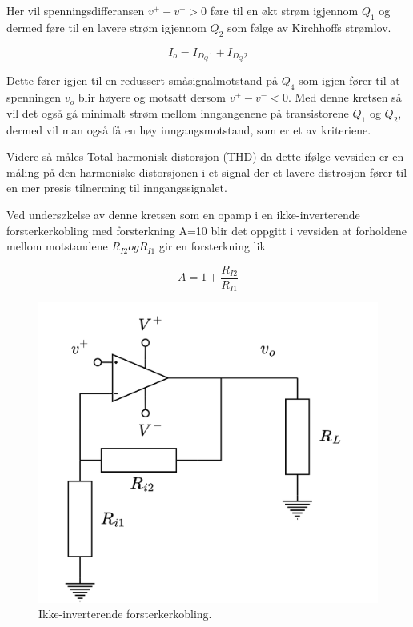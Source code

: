 Her vil spenningsdifferansen $v^+-v^- > 0$ føre til en økt strøm igjennom $Q_1$ og dermed føre til en lavere strøm igjennom $Q_2$ som følge av Kirchhoffs strømlov.
 
 \begin{equation}
	I_o = I_{D_Q1}+I_{D_Q2}
 \end{equation}

 Dette fører igjen til en redussert småsignalmotstand på $Q_4$ som igjen fører til at spenningen $v_o$ blir høyere og motsatt dersom $v^+-v^- < 0$. Med denne kretsen så vil det også gå minimalt strøm mellom inngangenene på transistorene $Q_1$ og $Q_2$, dermed vil man også få en høy inngangsmotstand, som er et av kriteriene.

 Videre så måles Total harmonisk distorsjon (THD) da dette ifølge vevsiden \cite{wikipediacontributors_2022_total} er en måling på den harmoniske distorsjonen i et signal der et lavere distrosjon fører til en mer presis tilnerming til inngangssignalet.

Ved undersøkelse av denne kretsen som en opamp i en ikke-inverterende forsterkerkobling med forsterkning A=10 blir det oppgitt i vevsiden \cite{a2020_glossary} at forholdene mellom motstandene ${R_{I2}} og $${R_{I1}}$ gir en forsterkning lik 

\begin{equation}
    A=1+\frac{R_{I2}}{R_{I1}}
	\label{eq:ikkeinv}
\end{equation}


\begin{figure}[H]
	\centering
	\includegraphics[scale=0.2]{./Images/03Research/ikkeinverterende.png}
	\caption{Ikke-inverterende forsterkerkobling.\cite{pham_2022_selvlaget}}
	\label{fig:Ikke-inverterende}
\end{figure}
